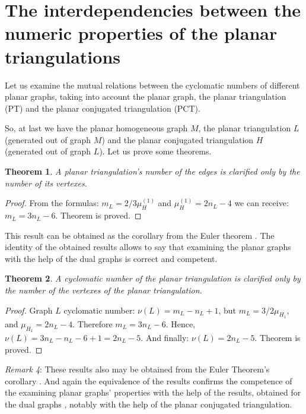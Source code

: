 \documentclass{amsart}
\newtheorem{theorem}{Theorem}
\theoremstyle{plain}
\numberwithin{equation}{section}
\begin{document}
\section{The interdependencies between the numeric properties of the planar triangulations}

Let us examine the mutual relations between the cyclomatic numbers of different planar graphs, taking into account the planar graph, the planar triangulation (PT) and the planar conjugated triangulation (PCT).

So, at last we have the planar homogeneous graph $M$, the planar triangulation $L$ (generated out of graph $M$) and the planar conjugated triangulation $H$ (generated out of graph $L$). Let us prove some theorems.

\begin{theorem}
A planar triangulation's number of the edges is clarified only by the number of its vertexes.
\end {theorem}

\begin{proof}
From the formulas: $m_L=2/3 \mu_H^{(1)}$ and $\mu_H^{(1)}=2n_L-4$ we can receive: $m_L=3n_L-6$. Theorem is proved.
\end {proof}

This result can be obtained as the corollary from the Euler theorem \cite {Harary}. The identity of the obtained results allows to say that examining the planar graphs with the help of the dual graphs is correct and competent.

\begin{theorem}
A cyclomatic number of the planar triangulation is clarified only by the number of the vertexes of the planar triangulation.
\end {theorem}

\begin{proof}
Graph $L$ cyclomatic number: $\nu(L)=m_L-n_L+1$, but $m_L=3/2 \mu_{H_1}$, and $\mu_{H_1} =2n_L-4$. Therefore $m_L=3n_L-6$. Hence, $\nu(L)=3n_L-n_L-6+1=2n_L-5$. And finally: $\nu(L)=2n_L-5$. Theorem is proved.
\end{proof}

\textit{Remark 4}: These results also may be obtained from the Euler Theorem's corollary \cite {Harary}. And again the equivalence of the results confirms the competence of the examining planar graphs' properties with the help of the results, obtained for the dual graphs \cite {Malinin}, notably with the help of the planar conjugated triangulation.
\end{document}
